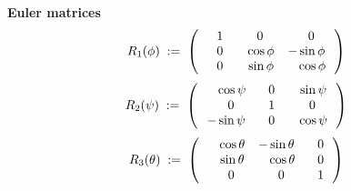 \vskip 0.1cm
\noindent
\textbf{Euler matrices}
\begin{equation*}
R_{1}(\phi)
\; := \;
	\left(\,
		\begin{array}{ccc}
			{\color{white}-}1 & {\color{white}-}0 & {\color{white}-}0 \\
			{\color{white}-}0 & {\color{white}-}\cos\phi & -\sin\phi \\
			{\color{white}-}0 & {\color{white}-}\sin\phi & {\color{white}-}\cos\phi \\
			\end{array}
		\,\right)
\end{equation*}
\begin{equation*}
R_{2}(\psi)
\; := \;
	\left(\,
		\begin{array}{ccc}
			{\color{white}-}\cos\psi & {\color{white}-}0 & {\color{white}-}\sin\psi \\
			{\color{white}-}0 & {\color{white}-}1 & {\color{white}-}0 \\
			-\sin\psi & {\color{white}-}0 & {\color{white}-}\cos\psi \\
			\end{array}
		\,\right)
\end{equation*}
\begin{equation*}
R_{3}(\theta)
\; := \;
	\left(\,
		\begin{array}{ccc}
			{\color{white}-}\cos\theta & -\sin\theta & {\color{white}-}0 \\
			{\color{white}-}\sin\theta & {\color{white}-}\cos\theta & {\color{white}-}0 \\
			{\color{white}-}0 & {\color{white}-}0 & {\color{white}-}1 \\
			\end{array}
		\,\right)
\end{equation*}


